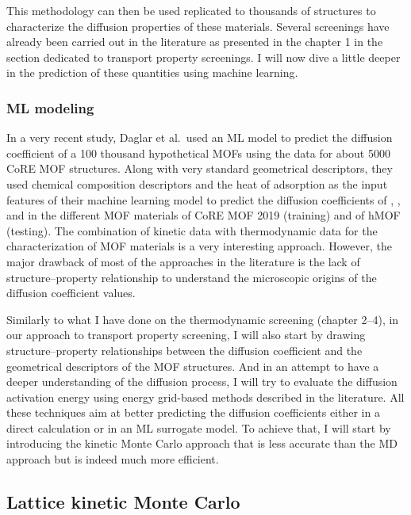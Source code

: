 \documentclass[main]{subfiles}
\begin{document}
This methodology can then be used replicated to thousands of structures to characterize the diffusion properties of these materials. Several screenings have already been carried out in the literature as presented in the chapter 1 in the section dedicated to transport property screenings. I will now dive a little deeper in the prediction of these quantities using machine learning.

\subsubsection{ML modeling}

In a very recent study, Daglar et al.\ used an ML model to predict the diffusion coefficient of a 100 thousand hypothetical MOFs using the data for about 5000 CoRE MOF structures.\autocite{Daglar_2022} Along with very standard geometrical descriptors, they used chemical composition descriptors and the heat of adsorption as the input features of their machine learning model to predict the diffusion coefficients of , ,  and  in the different MOF materials of CoRE MOF 2019 (training) and of hMOF (testing). The combination of kinetic data with thermodynamic data for the characterization of MOF materials is a very interesting approach. However, the major drawback of most of the approaches in the literature is the lack of structure--property relationship to understand the microscopic origins of the diffusion coefficient values.

Similarly to what I have done on the thermodynamic screening (chapter 2--4), in our approach to transport property screening, I will also start by drawing structure--property relationships between the diffusion coefficient and the geometrical descriptors of the MOF structures. And in an attempt to have a deeper understanding of the diffusion process, I will try to evaluate the diffusion activation energy using energy grid-based methods described in the literature. All these techniques aim at better predicting the diffusion coefficients either in a direct calculation or in an ML surrogate model. To achieve that, I will start by introducing the kinetic Monte Carlo approach that is less accurate than the MD approach but is indeed much more efficient.

\subsection{Lattice kinetic Monte Carlo}
\end{document}
